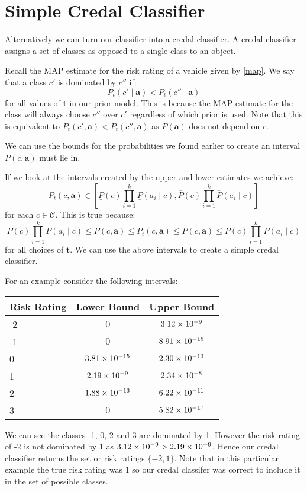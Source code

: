\section{Simple Credal Classifier}
Alternatively we can turn our classifier into a credal classifier.
A credal classifier assigns a set of classes as opposed to a single class to an object.

Recall the MAP estimate for the risk rating of a vehicle given by \cref{map}.
We say that a class $c'$ is dominated by $c''$ if:
\begin{equation}\label{Credal Dominance}
	P_t(c' \mid \mathbf{a}) < P_t(c'' \mid \mathbf{a})
\end{equation}
for all values of $\mathbf{t}$ in our prior model.
This is because the MAP estimate for the class will always choose $c''$ over $c'$ regardless of which prior is used.
Note that this is equivalent to $P_t(c', \mathbf{a}) < P_t(c'', \mathbf{a})$ as $P(\mathbf{a})$ does not depend on $c$.

We can use the bounds for the probabilities we found earlier to create an interval $P(c, \mathbf{a})$ must lie in. 

If we look at the intervals created by the upper and lower estimates we achieve:
\begin{equation}
	P_t(c, \mathbf{a}) \in \left[ \underline{P}(c)\prod_{i=1}^k \underline{P}(a_i \mid c), \overline{P}(c)\prod_{i=1}^k \overline{P}(a_i \mid c) \right]
\end{equation}
for each $c \in \mathcal{C}$.
This is true because:
\begin{equation}
\underline{P}(c)\prod_{i=1}^k \underline{P}(a_i \mid c) \leq \underline{P}(c, \mathbf{a}) \leq P_t(c, \mathbf{a}) \leq \overline{P}(c, \mathbf{a}) \leq \overline{P}(c)\prod_{i=1}^k \overline{P}(a_i \mid c)
\end{equation}
for all choices of $\mathbf{t}$.
We can use the above intervals to create a simple credal classifier.

For an example consider the following intervals:
\begin{center}
	\begin{tabular}{l|c c}
	Risk Rating & Lower Bound & Upper Bound \\
	\hline
	-2          & $0$              & ${3.12}\times 10^{-9}$  \\
	-1          & $0$              & ${8.91}\times 10^{-16}$ \\
	0           & ${3.81}\times 10^{-15}$ & ${2.30}\times 10^{-13}$ \\
	1           & ${2.19}\times 10^{-9}$  & ${2.34}\times 10^{-8}$  \\
	2           & ${1.88}\times 10^{-13}$ & ${6.22}\times 10^{-11}$ \\
	3           & $0$              & ${5.82}\times 10^{-17}$ \\
	\end{tabular}
\end{center}
We can see the classes -1, 0, 2 and 3 are dominated by 1.
However the risk rating of -2 is not dominated by 1 as ${3.12}\times 10^{-9} > {2.19}\times 10^{-9}$.
Hence our credal classifier returns the set or risk ratings $\{-2, 1\}$.
Note that in this particular example the true risk rating was 1 so our credal classifer was correct to include it in the set of possible classes.

